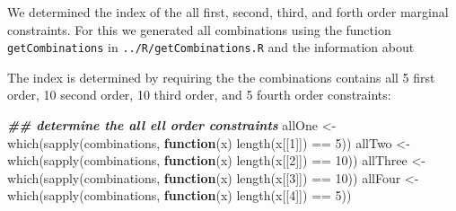 \documentclass[
]{article}
\newenvironment{Shaded}{\begin{snugshade}}{\end{snugshade}}
\newcommand{\ControlFlowTok}[1]{\textcolor[rgb]{0.13,0.29,0.53}{\textbf{#1}}}
\newcommand{\DecValTok}[1]{\textcolor[rgb]{0.00,0.00,0.81}{#1}}
\newcommand{\DocumentationTok}[1]{\textcolor[rgb]{0.56,0.35,0.01}{\textbf{\textit{#1}}}}
\newcommand{\FunctionTok}[1]{\textcolor[rgb]{0.00,0.00,0.00}{#1}}
\newcommand{\NormalTok}[1]{#1}
\newcommand{\OtherTok}[1]{\textcolor[rgb]{0.56,0.35,0.01}{#1}}
\newcommand{\SpecialCharTok}[1]{\textcolor[rgb]{0.00,0.00,0.00}{#1}}
\newcommand{\StringTok}[1]{\textcolor[rgb]{0.31,0.60,0.02}{#1}}
\begin{document}
We determined the index of the all first, second, third, and forth order
marginal constraints. For this we generated all combinations using the
function \texttt{getCombinations} in \texttt{../R/getCombinations.R} and
the information about

\begin{Shaded}
\end{Shaded}

The index is determined by requiring the the combinations contains all 5
first order, 10 second order, 10 third order, and 5 fourth order
constraints:

\begin{Shaded}
\begin{Highlighting}[]
\DocumentationTok{\#\# determine the all ell order constraints}
\NormalTok{allOne }\OtherTok{\textless{}{-}} \FunctionTok{which}\NormalTok{(}\FunctionTok{sapply}\NormalTok{(combinations, }\ControlFlowTok{function}\NormalTok{(x) }\FunctionTok{length}\NormalTok{(x[[}\DecValTok{1}\NormalTok{]]) }\SpecialCharTok{==} \DecValTok{5}\NormalTok{))}
\NormalTok{allTwo }\OtherTok{\textless{}{-}} \FunctionTok{which}\NormalTok{(}\FunctionTok{sapply}\NormalTok{(combinations, }\ControlFlowTok{function}\NormalTok{(x) }\FunctionTok{length}\NormalTok{(x[[}\DecValTok{2}\NormalTok{]]) }\SpecialCharTok{==} \DecValTok{10}\NormalTok{))}
\NormalTok{allThree }\OtherTok{\textless{}{-}} \FunctionTok{which}\NormalTok{(}\FunctionTok{sapply}\NormalTok{(combinations, }\ControlFlowTok{function}\NormalTok{(x) }\FunctionTok{length}\NormalTok{(x[[}\DecValTok{3}\NormalTok{]]) }\SpecialCharTok{==} \DecValTok{10}\NormalTok{))}
\NormalTok{allFour }\OtherTok{\textless{}{-}} \FunctionTok{which}\NormalTok{(}\FunctionTok{sapply}\NormalTok{(combinations, }\ControlFlowTok{function}\NormalTok{(x) }\FunctionTok{length}\NormalTok{(x[[}\DecValTok{4}\NormalTok{]]) }\SpecialCharTok{==} \DecValTok{5}\NormalTok{))}
\end{Highlighting}
\end{Shaded}
\end{document}
